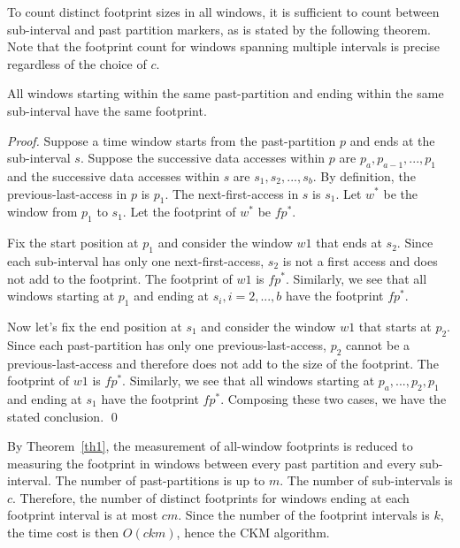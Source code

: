 To count distinct footprint sizes in all windows, it is sufficient to count
between sub-interval and past partition markers, as is stated by the
following theorem.  Note that the footprint count for windows spanning
multiple intervals is precise regardless of the choice of $c$.

\begin{theorem} All windows starting within the same past-partition
  and ending within the same sub-interval have the same footprint.
\label{th1}
\end{theorem}

\begin{proof}
Suppose a time window starts from the past-partition $p$ and ends at
the sub-interval $s$. Suppose the successive data accesses within $p$
are $p_a,p_{a-1},...,p_1$ and the successive data accesses within $s$
are $s_1,s_2,...,s_b$. By definition, the previous-last-access in $p$
is $p_1$.  The next-first-access in $s$ is $s_1$.  Let $w^*$ be the
window from $p_1$ to $s_1$.  Let the footprint of $w^*$ be $fp^*$.

Fix the start position at $p_1$ and consider the window $w1$
that ends at $s_2$.  Since each sub-interval has only one
next-first-access, $s_2$ is not a first access and does not add to the
footprint.  The footprint of $w1$ is $fp^*$.  Similarly, we see that
all windows starting at $p_1$ and ending at $s_i, i=2,...,b$ have the
footprint $fp^*$.

Now let's fix the end position at $s_1$ and consider the window $w1$
that starts at $p_2$.  Since each past-partition has only one
previous-last-access, $p_2$ cannot be a previous-last-access and
therefore does not add to the size of the footprint.  The footprint of
$w1$ is $fp^*$.  Similarly, we see that all windows starting at
$p_a,...,p_2,p_1$ and ending at $s_1$ have the footprint $fp^*$.
Composing these two cases, we have the stated conclusion.  \qed

\end{proof}

By Theorem~\ref{th1}, the measurement of all-window footprints is
reduced to measuring the footprint in windows between every past
partition and every sub-interval.  The number of past-partitions is up
to $m$.  The number of sub-intervals is $c$.  Therefore, the number of
distinct footprints for windows ending at each footprint interval is
at most $cm$.  Since the number of the footprint intervals is $k$, the
time cost is then $O(ckm)$, hence the CKM algorithm.

